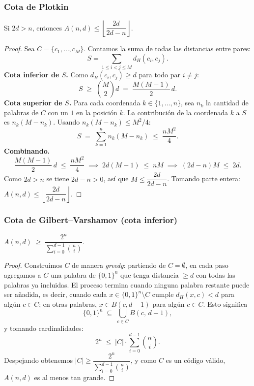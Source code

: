 \documentclass[12pt, spanish]{article}
\begin{document}
\subsubsection*{Cota de Plotkin}

\begin{proposition}
Si $2d > n$, entonces $A(n,d) \le \left\lfloor \dfrac{2d}{2d-n} \right\rfloor$.
\end{proposition}

\begin{proof}
Sea $C = \{c_1,\dots,c_M\}$. Contamos la suma de todas las distancias entre pares:
\[
  S = \sum_{1 \le i < j \le M} d_H(c_i, c_j).
\]
\textbf{Cota inferior de $S$.}
Como $d_H(c_i,c_j) \ge d$ para todo par $i \neq j$:
\[
  S \;\ge\; \binom{M}{2} d \;=\; \frac{M(M-1)}{2}\,d.
\]
\textbf{Cota superior de $S$.}
Para cada coordenada $k \in \{1,\dots,n\}$, sea $n_k$ la cantidad de palabras
de $C$ con un $1$ en la posición $k$.
La contribución de la coordenada $k$ a $S$ es $n_k(M - n_k)$.
Usando $n_k(M-n_k) \le M^2/4$:
\[
  S \;=\; \sum_{k=1}^{n} n_k(M-n_k) \;\le\; \frac{nM^2}{4}.
\]
\textbf{Combinando.}
\[
  \frac{M(M-1)}{2}\,d \;\le\; \frac{nM^2}{4}
  \;\implies\; 2d(M-1) \;\le\; nM
  \;\implies\; (2d - n)M \;\le\; 2d.
\]
Como $2d > n$ se tiene $2d - n > 0$, así que $M \le \dfrac{2d}{2d-n}$.
Tomando parte entera: $A(n,d) \le \left\lfloor \dfrac{2d}{2d-n}\right\rfloor$.
\end{proof}

\subsubsection*{Cota de Gilbert–Varshamov (cota inferior)}

\begin{proposition}
$A(n,d) \;\ge\; \dfrac{2^n}{\displaystyle\sum_{i=0}^{d-1}\binom{n}{i}}$.
\end{proposition}

\begin{proof}
Construimos $C$ de manera \emph{greedy}: partiendo de $C = \emptyset$,
en cada paso agregamos a $C$ una palabra de $\{0,1\}^n$ que tenga distancia
$\ge d$ con todas las palabras ya incluidas.
El proceso termina cuando ninguna palabra restante puede ser añadida,
es decir, cuando cada $x \in \{0,1\}^n \setminus C$ cumple $d_H(x,c) < d$
para algún $c \in C$; en otras palabras, $x \in B(c, d-1)$ para algún $c \in C$.
Esto significa
\[
  \{0,1\}^n \;\subseteq\; \bigcup_{c \in C} B(c,\,d-1),
\]
y tomando cardinalidades:
\[
  2^n \;\le\; |C| \cdot \sum_{i=0}^{d-1}\binom{n}{i}.
\]
Despejando obtenemos $|C| \ge \dfrac{2^n}{\sum_{i=0}^{d-1}\binom{n}{i}}$,
y como $C$ es un código válido, $A(n,d)$ es al menos tan grande.
\end{proof}
\end{document}
